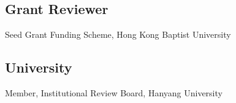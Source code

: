 \subsection{Grant Reviewer}
\begin{aka}
   \item [2023] Seed Grant Funding Scheme, Hong Kong Baptist University

\end{aka}

\subsection{University}
\begin{aka}
    \item [2026--\textnormal{Present}] Member, Institutional Review Board, Hanyang University
\end{aka}







